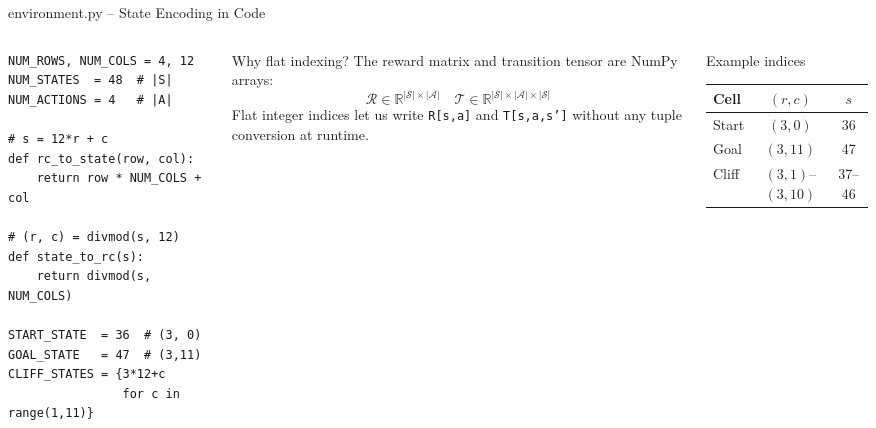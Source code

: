 \documentclass[aspectratio=169,8pt]{beamer}
\newcommand{\St}{\mathcal{S}}
\newcommand{\Act}{\mathcal{A}}
\begin{document}
\begin{frame}[fragile,shrink=5]{environment.py -- State Encoding in Code}
  \begin{columns}[T]
    \begin{lstlisting}
NUM_ROWS, NUM_COLS = 4, 12
NUM_STATES  = 48  # |S|
NUM_ACTIONS = 4   # |A|

# s = 12*r + c
def rc_to_state(row, col):
    return row * NUM_COLS + col

# (r, c) = divmod(s, 12)
def state_to_rc(s):
    return divmod(s, NUM_COLS)

START_STATE  = 36  # (3, 0)
GOAL_STATE   = 47  # (3,11)
CLIFF_STATES = {3*12+c
                for c in range(1,11)}
    \end{lstlisting}

    \begin{block}{Why flat indexing?}
      The reward matrix and transition tensor
      are NumPy arrays:
      \[
        \mathcal{R}\in\mathbb{R}^{|\St|\times|\Act|}
        \quad
        \mathcal{T}\in\mathbb{R}^{|\St|\times|\Act|\times|\St|}
      \]
      Flat integer indices let us write
      \texttt{R[s,a]} and \texttt{T[s,a,s']}
      without any tuple conversion at runtime.
    \end{block}
    \begin{block}{Example indices}
      \small
      \begin{tabular}{lcc}
        \toprule
        Cell & $(r,c)$ & $s$ \\
        \midrule
        Start & $(3,0)$  & 36 \\
        Goal  & $(3,11)$ & 47 \\
        Cliff & $(3,1)$--$(3,10)$ & 37--46 \\
        \bottomrule
      \end{tabular}
    \end{block}
  \end{columns}
\end{frame}
\end{document}
